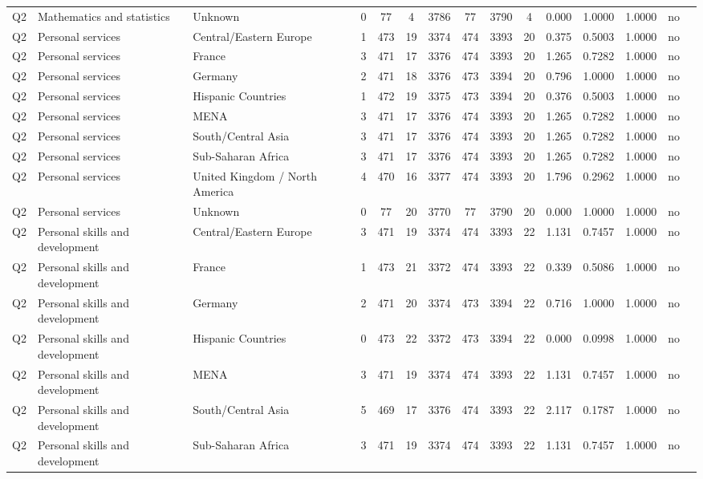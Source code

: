\begin{longtable}{lllrcccccccccll}
Q2 & Mathematics and statistics & Unknown & 0 & 77 & 4 & 3786 & 77 & 3790 & 4 & 0.000 & 1.0000 & 1.0000 & no \\
Q2 & Personal services & Central/Eastern Europe & 1 & 473 & 19 & 3374 & 474 & 3393 & 20 & 0.375 & 0.5003 & 1.0000 & no \\
Q2 & Personal services & France & 3 & 471 & 17 & 3376 & 474 & 3393 & 20 & 1.265 & 0.7282 & 1.0000 & no \\
Q2 & Personal services & Germany & 2 & 471 & 18 & 3376 & 473 & 3394 & 20 & 0.796 & 1.0000 & 1.0000 & no \\
Q2 & Personal services & Hispanic Countries & 1 & 472 & 19 & 3375 & 473 & 3394 & 20 & 0.376 & 0.5003 & 1.0000 & no \\
Q2 & Personal services & MENA & 3 & 471 & 17 & 3376 & 474 & 3393 & 20 & 1.265 & 0.7282 & 1.0000 & no \\
Q2 & Personal services & South/Central Asia & 3 & 471 & 17 & 3376 & 474 & 3393 & 20 & 1.265 & 0.7282 & 1.0000 & no \\
Q2 & Personal services & Sub-Saharan Africa & 3 & 471 & 17 & 3376 & 474 & 3393 & 20 & 1.265 & 0.7282 & 1.0000 & no \\
Q2 & Personal services & United Kingdom / North America & 4 & 470 & 16 & 3377 & 474 & 3393 & 20 & 1.796 & 0.2962 & 1.0000 & no \\
Q2 & Personal services & Unknown & 0 & 77 & 20 & 3770 & 77 & 3790 & 20 & 0.000 & 1.0000 & 1.0000 & no \\
Q2 & Personal skills and development & Central/Eastern Europe & 3 & 471 & 19 & 3374 & 474 & 3393 & 22 & 1.131 & 0.7457 & 1.0000 & no \\
Q2 & Personal skills and development & France & 1 & 473 & 21 & 3372 & 474 & 3393 & 22 & 0.339 & 0.5086 & 1.0000 & no \\
Q2 & Personal skills and development & Germany & 2 & 471 & 20 & 3374 & 473 & 3394 & 22 & 0.716 & 1.0000 & 1.0000 & no \\
Q2 & Personal skills and development & Hispanic Countries & 0 & 473 & 22 & 3372 & 473 & 3394 & 22 & 0.000 & 0.0998 & 1.0000 & no \\
Q2 & Personal skills and development & MENA & 3 & 471 & 19 & 3374 & 474 & 3393 & 22 & 1.131 & 0.7457 & 1.0000 & no \\
Q2 & Personal skills and development & South/Central Asia & 5 & 469 & 17 & 3376 & 474 & 3393 & 22 & 2.117 & 0.1787 & 1.0000 & no \\
Q2 & Personal skills and development & Sub-Saharan Africa & 3 & 471 & 19 & 3374 & 474 & 3393 & 22 & 1.131 & 0.7457 & 1.0000 & no \\

\end{longtable}
